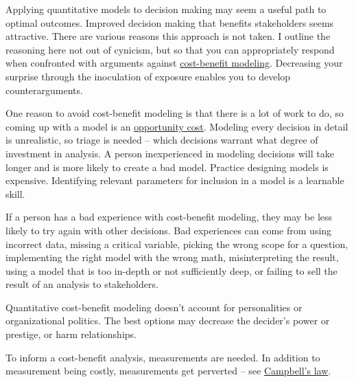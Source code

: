 Applying quantitative models to decision making may seem a useful path to optimal outcomes. Improved decision making that benefits stakeholders seems attractive. There are various reasons this approach is not taken. I outline the reasoning here not out of cynicism, but so that you can appropriately respond when confronted with arguments against \href{https://en.wikipedia.org/wiki/Cost\%E2\%80\%93benefit_analysis}{cost-benefit modeling}.
Decreasing your surprise through the inoculation of exposure enables you to develop counterarguments. 

One reason to avoid cost-benefit modeling is that there is a lot of work to do, so coming up with a model is an \href{https://en.wikipedia.org/wiki/Opportunity_cost}{opportunity cost}. 
Modeling every decision in detail is unrealistic, so triage is needed -- which decisions warrant what degree of investment in analysis. A person inexperienced in modeling decisions will take longer and is more likely to create a bad model. Practice designing models is expensive. Identifying relevant parameters for inclusion in a model is a learnable skill. 

If a person has a bad experience with cost-benefit modeling, they may be less likely to try again with other decisions. Bad experiences can come from using incorrect data, missing a critical variable, picking the wrong scope for a question, implementing the right model with the wrong math, misinterpreting the result, using a model that is too in-depth or not sufficiently deep, or failing to sell the result of an analysis to stakeholders.

Quantitative cost-benefit modeling doesn't account for personalities or organizational politics. The best options may decrease the decider's power or prestige, or harm relationships. 

To inform a cost-benefit analysis, measurements are needed. In addition to measurement being costly, measurements get perverted -- see \href{https://en.wikipedia.org/wiki/Campbell\%27s_law}{Campbell's law}. 

